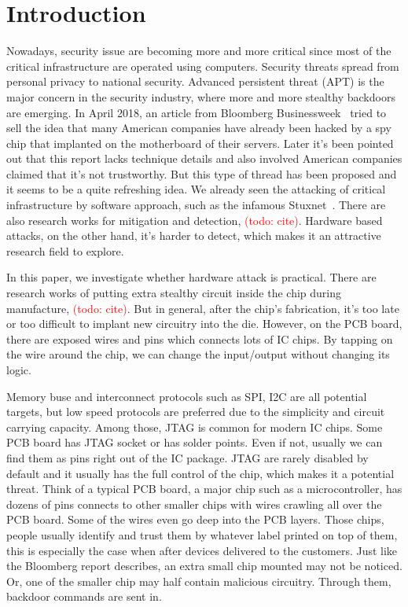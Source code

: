 \section{Introduction}
\label{sec:introduction}
Nowadays, security issue are becoming more and more critical since most of the critical infrastructure are operated using computers. Security threats spread from personal privacy to national security. Advanced persistent threat (APT) is the major concern in the security industry, where more and more stealthy backdoors are emerging. In April 2018, an article from Bloomberg Businessweek~\cite{robertson2018big} tried to sell the idea that many American companies have already been hacked by a spy chip that implanted on the motherboard of their servers. Later it's been pointed out that this report lacks technique details and also involved American companies claimed that it's not trustworthy. But this type of thread has been proposed and it seems to be a quite refreshing idea. We already seen the attacking of critical infrastructure by software approach, such as the infamous Stuxnet~\cite{langner2011stuxnet}. There are also research works for mitigation and detection, \textcolor{red}{(todo: cite)}. Hardware based attacks, on the other hand, it's harder to detect, which makes it an attractive research field to explore. 

In this paper, we investigate whether hardware attack is practical. There are research works of putting extra stealthy circuit inside the chip during manufacture, \textcolor{red}{(todo: cite)}. But in general, after the chip's fabrication, it's too late or too difficult to implant new circuitry into the die. However, on the PCB board, there are exposed wires and pins which connects lots of IC chips. By tapping on the wire around the chip, we can change the input/output without changing its logic.

Memory buse and interconnect protocols such as SPI, I2C are all potential targets, but low speed protocols are preferred due to the simplicity and circuit carrying capacity. Among those, JTAG is common for modern IC chips. Some PCB board has JTAG socket or has solder points. Even if not, usually we can find them as pins right out of the IC package. JTAG are rarely disabled by default and it usually has the full control of the chip, which makes it a potential threat. Think of a typical PCB board, a major chip such as a microcontroller, has dozens of pins connects to other smaller chips with wires crawling all over the PCB board. Some of the wires even go deep into the PCB layers. Those chips, people usually identify and trust them by whatever label printed on top of them, this is especially the case when after devices delivered to the customers. Just like the Bloomberg report describes, an extra small chip mounted may not be noticed. Or, one of the smaller chip may half contain malicious circuitry. Through them, backdoor commands are sent in.

